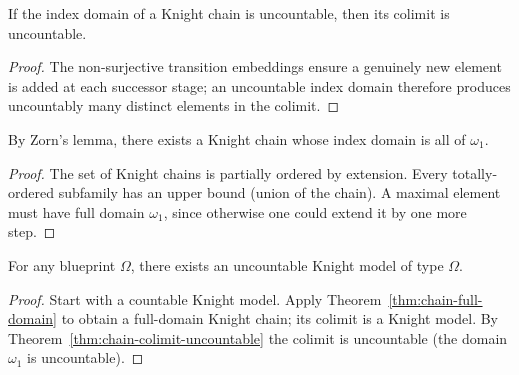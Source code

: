\begin{theorem}
  \label{thm:chain-colimit-uncountable}
  \leanok
  If the index domain of a Knight chain is uncountable, then its colimit is uncountable.
\end{theorem}

\begin{proof}
  \leanok
  The non-surjective transition embeddings ensure a genuinely new element is added at each successor stage; an uncountable index domain therefore produces uncountably many distinct elements in the colimit.
\end{proof}

\begin{theorem}
  \label{thm:chain-full-domain}
  \leanok
  By Zorn's lemma, there exists a Knight chain whose index domain is all of $\omega_1$.
\end{theorem}

\begin{proof}
  \leanok
  The set of Knight chains is partially ordered by extension. Every totally-ordered subfamily has an upper bound (union of the chain). A maximal element must have full domain $\omega_1$, since otherwise one could extend it by one more step.
\end{proof}

\begin{theorem}
  \label{thm:chain-uncountable-model}
  \leanok
  For any blueprint $\Omega$, there exists an uncountable Knight model of type $\Omega$.
\end{theorem}

\begin{proof}
  \leanok
  Start with a countable Knight model.
  Apply Theorem~\ref{thm:chain-full-domain} to obtain a full-domain Knight chain; its colimit is a Knight model.
  By Theorem~\ref{thm:chain-colimit-uncountable} the colimit is uncountable (the domain $\omega_1$ is uncountable).
\end{proof}


